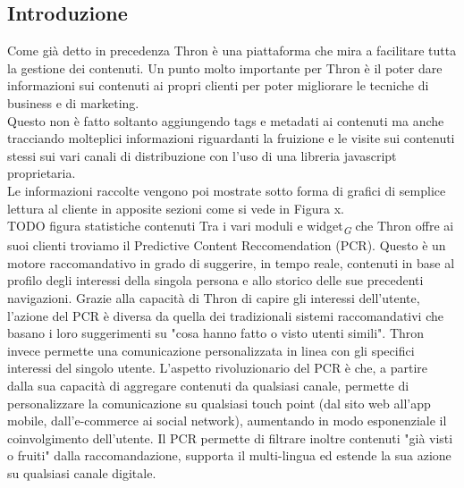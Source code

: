 \documentclass[a4paper, 12pt, twoside, openright]{book}
\newcommand{\gloss}[1]{#1\textsubscript{\textit{\tiny{G}}}}
\begin{document}
\subsection{Introduzione}
Come già detto in precedenza Thron è una piattaforma che mira a facilitare tutta la gestione dei contenuti. Un punto molto importante per Thron è il poter dare informazioni sui contenuti ai propri clienti per poter migliorare le tecniche di business e di marketing.\\Questo non è fatto soltanto aggiungendo tags e metadati ai contenuti ma anche tracciando molteplici informazioni riguardanti la fruizione e le visite sui contenuti stessi sui vari canali di distribuzione con l'uso di una libreria javascript proprietaria.\\Le informazioni raccolte vengono poi mostrate sotto forma di grafici di semplice lettura al cliente in apposite sezioni come si vede in Figura x.\\ TODO figura statistiche contenuti
Tra i vari moduli e \gloss{widget} che Thron offre ai suoi clienti troviamo il Predictive Content Reccomendation (PCR). Questo è un motore raccomandativo in grado di suggerire, in tempo reale, contenuti in base al profilo degli interessi della singola persona e allo storico delle sue precedenti navigazioni. Grazie alla capacità di Thron di capire gli interessi dell'utente, l'azione del PCR è diversa da quella dei tradizionali sistemi raccomandativi che basano i loro suggerimenti su "cosa hanno fatto o visto utenti simili". Thron invece permette una comunicazione personalizzata in linea con gli specifici interessi del singolo utente. L'aspetto rivoluzionario del PCR è che, a partire dalla sua capacità di aggregare contenuti da qualsiasi canale, permette di personalizzare la comunicazione su qualsiasi touch point (dal sito web all'app mobile, dall'e-commerce ai social network), aumentando in modo esponenziale il coinvolgimento dell'utente. Il PCR permette di filtrare inoltre contenuti "già visti o fruiti" dalla raccomandazione, supporta il multi-lingua ed estende la sua azione su qualsiasi canale digitale.
\end{document}
